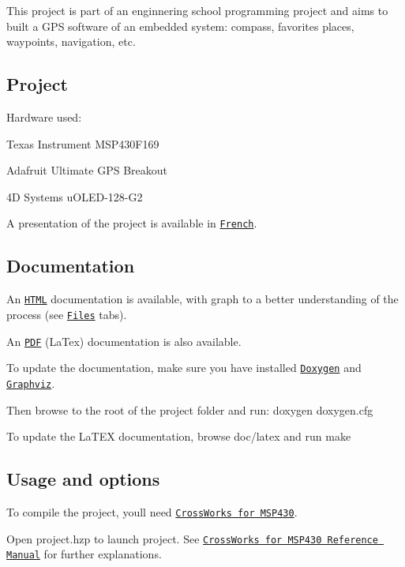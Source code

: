 This project is part of an enginnering school programming project and aims to built a G\+PS software of an embedded system\+: compass, favorites places, waypoints, navigation, etc.

\subsection*{Project}

Hardware used\+:


\begin{DoxyItemize}
\item Texas Instrument M\+S\+P430\+F169
\item Adafruit Ultimate G\+PS Breakout
\item 4D Systems u\+O\+L\+E\+D-\/128-\/\+G2
\end{DoxyItemize}

A presentation of the project is available in \href{http://gaelfoppolo.github.io/gps/presentation}{\tt French}.

\subsection*{Documentation}

An \href{http://gaelfoppolo.github.io/gps/}{\tt H\+T\+ML} documentation is available, with graph to a better understanding of the process (see \href{http://gaelfoppolo.github.io/gps/files.html}{\tt Files} tabs).

An \href{http://gaelfoppolo.github.io/gps/latex/refman.pdf}{\tt P\+DF} (La\+Tex) documentation is also available.

To update the documentation, make sure you have installed \href{http://www.stack.nl/~dimitri/doxygen/}{\tt Doxygen} and \href{http://www.graphviz.org/}{\tt Graphviz}.

Then browse to the root of the project folder and run\+: {\ttfamily doxygen doxygen.\+cfg}

To update the La\+T\+EX documentation, browse {\ttfamily doc/latex} and run {\ttfamily make}

\subsection*{Usage and options}

To compile the project, you\textquotesingle{}ll need \href{http://www.rowley.co.uk/msp430/releases.htm}{\tt Cross\+Works for M\+S\+P430}.

Open {\ttfamily project.\+hzp} to launch project. See \href{http://cdn.rowleydownload.co.uk/msp430/documentation/msp430_crossworks_reference_manual.pdf}{\tt Cross\+Works for M\+S\+P430 Reference Manual} for further explanations. 